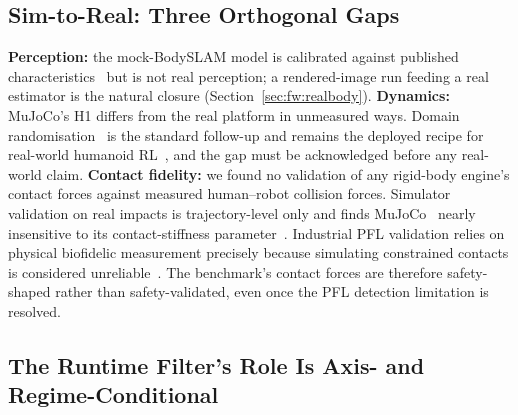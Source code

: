 \documentclass[11pt,a4paper]{report}
\newcommand{\pfl}{PFL}
\newcommand{\bodyslampp}{BodySLAM\nolinebreak[4]\hspace{-.05em}\raisebox{.2ex}{\scriptsize ++}}
\begin{document}
\subsection{Sim-to-Real: Three Orthogonal Gaps}
\label{sec:disc:sim2real}

\textbf{Perception:} the mock-\bodyslampp{} model is calibrated
against published characteristics~\cite{henning2023bodyslampp} but
is not real perception; a rendered-image run feeding a real
estimator is the natural closure
(Section~\ref{sec:fw:realbody}). \textbf{Dynamics:} MuJoCo's H1
differs from the real platform in unmeasured ways. Domain
randomisation~\cite{tobin2017domainrand}
is the standard follow-up and remains the deployed recipe for
real-world humanoid RL~\cite{radosavovic2024humanoid}, and the gap
must be acknowledged before any real-world claim. \textbf{Contact
fidelity:} we found no validation of any rigid-body engine's contact
forces against measured human--robot collision forces.
Simulator validation on real impacts is trajectory-level only and
finds MuJoCo~\cite{todorov2012mujoco} nearly insensitive to its
contact-stiffness parameter~\cite{acosta2022simvalidation}. Industrial
\pfl{} validation relies on physical biofidelic measurement precisely
because simulating constrained contacts is considered
unreliable~\cite{schlotzhauer2022pfl,svarny2020collision}. The
benchmark's contact forces are therefore safety-shaped rather than
safety-validated, even once the \pfl{} detection limitation is
resolved.

\subsection{The Runtime Filter's Role Is Axis- and Regime-Conditional}
\label{sec:disc:filter-role}
\end{document}
